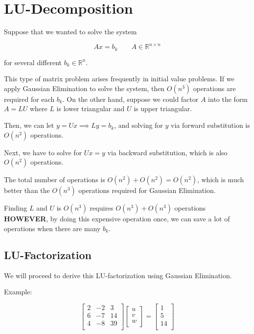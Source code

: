 \renewcommand{\arraystretch}{1.25} %
\setlength{\arraycolsep}{12pt}

\section{LU-Decomposition}

Suppose that we wanted to solve the system

\begin{equation*}
  Ax = b_k \qquad A \in \mathbb{R}^{n \times n}
\end{equation*}

for several different $b_k \in \mathbb{R}^n$. 

This type of matrix problem arises frequently in initial value problems. If we
apply Gaussian Elimination to solve the system, then $O(n^3)$ operations are
required for each $b_k$. On the other hand, suppose we could factor $A$ into
the form $A = LU$ where $L$ is lower triangular and $U$ is upper triangular.

Then, we can let $y=Ux\implies Ly = b_k$, and solving for $y$ via forward
substitution is $O(n^2)$ operations.

Next, we have to solve for $Ux=y$ via backward substitution, which is also 
$O(n^2)$ operations.

The total number of operations is $O(n^2) + O(n^2) = O(n^2)$, which is much
better than the $O(n^3)$ operations required for Gaussian Elimination.

Finding $L$ and $U$ is $O(n^3)$ requires $O(n^3) + O(n^3)$ operations
\textbf{HOWEVER}, by doing this expensive operation once, we can save a lot of
operations when there are many $b_k$.

\subsection{LU-Factorization}

We will proceed to derive this LU-factorization using Gaussian Elimination.

Example:

\begin{equation*}
  \begin{bmatrix}
    2 & -2 & 3\\
    6 & -7 & 14\\
    4 & -8 & 39\\
  \end{bmatrix}
  \begin{bmatrix}
    u\\
    v\\
    w\\
  \end{bmatrix}
  =
  \begin{bmatrix}
    1\\
    5\\
    14\\
  \end{bmatrix}
\end{equation*}

